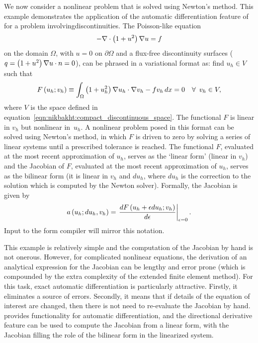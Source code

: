 We now consider a nonlinear problem that is solved using Newton's
method.  This example demonstrates the application of the automatic
differentiation feature of \ufl{} for a problem involving\break \hbox{discontinuities.}
The Poisson-like equation
%
\begin{equation}
  -\nabla \cdot \left( {1 + u^{2}} \right) \nabla u = f
\end{equation}
%
on the domain $\Omega$, with $u = 0$ on $\partial \Omega$ and a flux-free
discontinuity surfaces ($q = \left( {1 + u^{2}} \right) \nabla u \cdot n
= 0$), can be phrased in a variational format as: find $u_{h} \in V$
such that
%
\begin{equation}
  F\left( {u_{h}; v_{h}} \right)
    \equiv \int_{\Omega} \left( {1 + u_{h}^{2}} \right) \nabla u_{h} \cdot \nabla v_{h}
      - f v_{h}  \, d x
    = 0 \quad \forall\, \ v_{h} \in V,
\label{eqn:nikbakht:nonlinear_poisson}
\end{equation}
%
where $V$ is the space defined in
equation~\eqref{eqn:nikbakht:compact_discontinuous_space}.
The functional
$F$ is linear in $v_{h}$ but nonlinear in~$u_{h}$.  A nonlinear problem
posed in this format can be solved using Newton's method, in which $F$ is
driven to zero by solving a series of linear systems until a prescribed
tolerance is reached. The functional $F$, evaluated at the most recent
approximation of $u_{h}$, serves as the `linear form' (linear in $v_{h}$)
and the Jacobian of $F$, evaluated at the most recent approximation
of $u_{h}$, serves as the bilinear form (it is linear in $v_{h}$ and
$du_{h}$, where $du_{h}$ is the correction to the solution which is
computed by the Newton solver). Formally, the Jacobian is given by
%
\begin{equation}
  a\left( {u_{h}; du_{h}, v_{h}} \right) = \left. \frac{dF\left( {u_{h}
      + \epsilon du_{h}; v_{h}} \right)}{d \epsilon} \right|_{\epsilon=0}.
\label{eqn:nikbakht:nonlinear_poisson_J}
\end{equation}
%
Input to the form compiler will mirror this notation.

This example is relatively simple and the computation of the Jacobian
by hand is not onerous. However, for complicated nonlinear equations,
the derivation of an analytical expression for the Jacobian can be
lengthy and error prone (which is compounded by the extra complexity of
the extended finite element method).  For this task, exact automatic
differentiation is particularly attractive. Firstly, it eliminates a
source of errors.  Secondly, it means that if details of the equation of
interest are changed, then there is not need to re-evaluate the Jacobian
by hand. \ufl{} provides functionality for automatic differentiation,
and the directional derivative feature can be used to compute the Jacobian
from a linear form, with the Jacobian filling the role of the bilinear
form in the linearized system.

